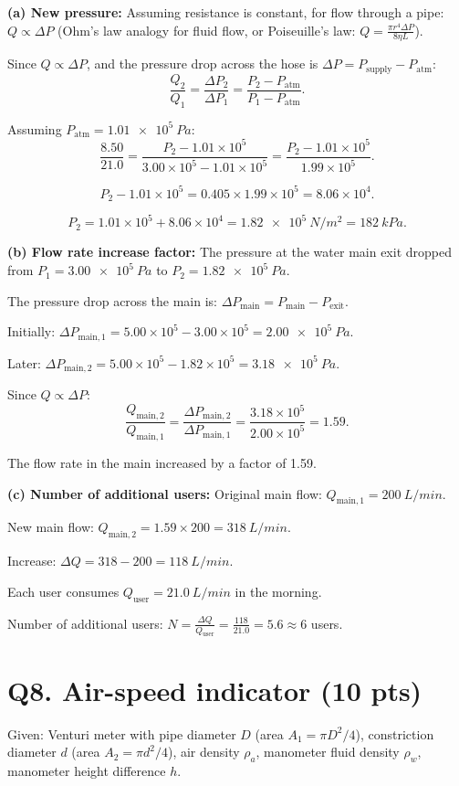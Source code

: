 \documentclass[11pt]{article}
\newcommand{\ans}[1]{\boxed{\displaystyle #1}}
\begin{document}
\textbf{(a) New pressure:} Assuming resistance is constant, for flow through a pipe: $Q \propto \Delta P$ (Ohm's law analogy for fluid flow, or Poiseuille's law: $Q = \frac{\pi r^4 \Delta P}{8\eta L}$).

Since $Q \propto \Delta P$, and the pressure drop across the hose is $\Delta P = P_{\text{supply}} - P_{\text{atm}}$:
\[ \frac{Q_2}{Q_1} = \frac{\Delta P_2}{\Delta P_1} = \frac{P_2 - P_{\text{atm}}}{P_1 - P_{\text{atm}}}. \]

Assuming $P_{\text{atm}} = \SI{1.01e5}{Pa}$:
\[ \frac{8.50}{21.0} = \frac{P_2 - 1.01 \times 10^5}{3.00 \times 10^5 - 1.01 \times 10^5} = \frac{P_2 - 1.01 \times 10^5}{1.99 \times 10^5}. \]

\[ P_2 - 1.01 \times 10^5 = 0.405 \times 1.99 \times 10^5 = 8.06 \times 10^4. \]

\[ P_2 = 1.01 \times 10^5 + 8.06 \times 10^4 = \ans{\SI{1.82e5}{N/m^2} = \SI{182}{kPa}}. \]

\textbf{(b) Flow rate increase factor:} The pressure at the water main exit dropped from $P_1 = \SI{3.00e5}{Pa}$ to $P_2 = \SI{1.82e5}{Pa}$.

The pressure drop across the main is: $\Delta P_{\text{main}} = P_{\text{main}} - P_{\text{exit}}$.

Initially: $\Delta P_{\text{main},1} = 5.00 \times 10^5 - 3.00 \times 10^5 = \SI{2.00e5}{Pa}$.

Later: $\Delta P_{\text{main},2} = 5.00 \times 10^5 - 1.82 \times 10^5 = \SI{3.18e5}{Pa}$.

Since $Q \propto \Delta P$:
\[ \frac{Q_{\text{main},2}}{Q_{\text{main},1}} = \frac{\Delta P_{\text{main},2}}{\Delta P_{\text{main},1}} = \frac{3.18 \times 10^5}{2.00 \times 10^5} = \ans{1.59}. \]

The flow rate in the main increased by a factor of 1.59.

\textbf{(c) Number of additional users:} Original main flow: $Q_{\text{main},1} = \SI{200}{L/min}$.

New main flow: $Q_{\text{main},2} = 1.59 \times 200 = \SI{318}{L/min}$.

Increase: $\Delta Q = 318 - 200 = \SI{118}{L/min}$.

Each user consumes $Q_{\text{user}} = \SI{21.0}{L/min}$ in the morning.

Number of additional users: $N = \frac{\Delta Q}{Q_{\text{user}}} = \frac{118}{21.0} = \ans{5.6 \approx 6}$ users.

\section*{Q8. Air-speed indicator (10 pts)}
Given: Venturi meter with pipe diameter $D$ (area $A_1 = \pi D^2/4$), constriction diameter $d$ (area $A_2 = \pi d^2/4$), air density $\rho_a$, manometer fluid density $\rho_w$, manometer height difference $h$.
\end{document}
